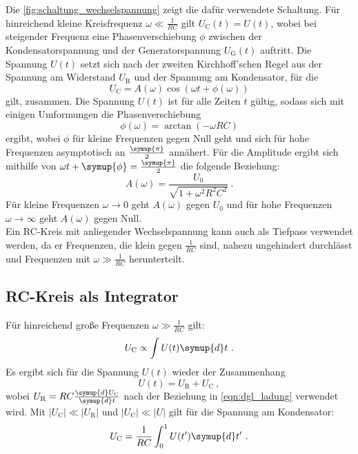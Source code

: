     Die \autoref{fig:schaltung_wechselspannung} zeigt die dafür verwendete Schaltung.
    Für hinreichend kleine Kreisfrequenz $\omega \ll \frac{1}{RC}$ gilt $U_\text{C}(t) = U(t)$,
    wobei bei steigender Frequenz eine Phasenverschiebung $\phi$ zwischen der Kondensatorspannung und der Generatorspannung $U_\text{G}(t)$ auftritt.
    Die Spannung $U(t)$ setzt sich nach der zweiten Kirchhoff'schen Regel aus der Spannung am Widerstand $U_\text{R}$ und der Spannung am Kondensator,
    für die
    \begin{equation}
        U_\text{C} = A(\omega) \cos{(\omega t + \phi(\omega))}
    \end{equation}
    gilt,
    zusammen.
    Die Spannung $U(t)$ ist für alle Zeiten $t$ gültig,
    sodass sich mit einigen Umformungen die Phasenverschiebung
    \begin{equation}
        \phi(\omega) = \arctan{(- \omega RC)}
        \label{eqn:phasenverschiebung}
    \end{equation}
    ergibt,
    wobei $\phi$ für kleine Frequenzen gegen Null geht und sich für hohe Frequenzen asymptotisch an $\frac{\symup{\pi}}{2}$ annähert.
    Für die Amplitude ergibt sich mithilfe von $\omega t + \symup{\phi} = \frac{\symup{\pi}}{2}$ die folgende Beziehung:
    \begin{equation}
        A(\omega) = \frac{U_0}{\sqrt{1 + {\omega}^2 R^2 C^2}} \ .
        \label{eqn:amplitude}
    \end{equation}
    Für kleine Frequenzen $\omega \to 0$ geht $A(\omega)$ gegen $U_0$ und für hohe Frequenzen $\omega \to \infty$ geht $A(\omega)$ gegen Null.\\
    Ein RC-Kreis mit anliegender Wechselspannung kann auch als Tiefpass verwendet werden,
    da er Frequenzen,
    die klein gegen $\frac{1}{RC}$ sind,
    nahezu ungehindert durchlässt
    und Frequenzen mit $\omega \gg \frac{1}{RC}$ herunterteilt.

\subsection{RC-Kreis als Integrator}

    Für hinreichend große Frequenzen $\omega \gg \frac{1}{RC}$ gilt:
    \begin{equation*}
        U_\text{C} \propto \int U(t) \symup{d}t \ .
    \end{equation*}
    Es ergibt sich für die Spannung $U(t)$ wieder der Zusammenhang
    \begin{equation}
        U(t) = U_\text{R} + U_\text{C} \ ,
    \end{equation}
    wobei $U_\text{R} = RC \frac{\symup{d}U_\text{C}}{\symup{d}t}$ nach der Beziehung in \autoref{eqn:dgl_ladung} verwendet wird.
    Mit
    $\lvert U_\text{C} \rvert \ll \lvert U_\text{R} \rvert$ und
    $\lvert U_\text{C} \rvert \ll \lvert U \rvert$
    gilt für die Spannung am Kondensator:
    \begin{equation}
        U_\text{C} = \frac{1}{RC} \int_0^1 U(t') \symup{d}t' \ .
        \label{eqn:integrator}
    \end{equation}
